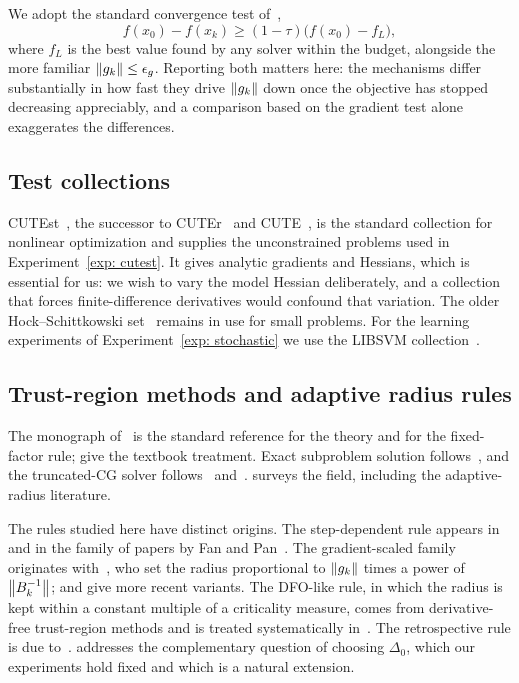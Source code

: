 \documentclass[11pt]{article}
\theoremstyle{plain}
\theoremstyle{definition}
\theoremstyle{remark}
\numberwithin{equation}{section}
\begin{document}
We adopt the standard convergence test of~\citet{MoreWild09},
\begin{equation}
  f(x_0) - f(x_k) \geq (1 - \tau)\bigl(f(x_0) - f_L\bigr),
  \label{eqn: convergence test}
\end{equation}
where $f_L$ is the best value found by any solver within the budget, alongside the more familiar
$\left \lVert g_k \right \rVert \leq \epsilon_g$. Reporting both matters here: the mechanisms differ substantially
in how fast they drive $\left \lVert g_k \right \rVert$ down once the objective has stopped decreasing appreciably,
and a comparison based on the gradient test alone exaggerates the differences.

\subsection{Test collections}

CUTEst~\citep{GouldOrbanToint15}, the successor to
CUTEr~\citep{GouldOrbanToint03} and CUTE~\citep{BongartzConnGouldToint95}, is the standard
collection for nonlinear optimization and supplies the unconstrained problems used in
Experiment~\ref{exp: cutest}. It gives analytic gradients and Hessians, which is essential for
us: we wish to vary the model Hessian deliberately, and a collection that forces
finite-difference derivatives would confound that variation. The older Hock--Schittkowski
set~\citep{HockSchittkowski81} remains in use for small problems. For the learning experiments
of Experiment~\ref{exp: stochastic} we use the LIBSVM
collection~\citep{ChangLin11}.

\subsection{Trust-region methods and adaptive radius rules}

The monograph of~\citet{ConnGoulToin00} is the standard reference for the theory and for the
fixed-factor rule; \citet{NoceWrig06} give the textbook treatment. Exact subproblem solution
follows~\citet{MoreSorensen1983}, and the truncated-CG solver
follows~\citet{Steihaug83} and~\citet{Toint81}. \citet{Yuan15} surveys the field, including the
adaptive-radius literature.

The rules studied here have distinct origins. The step-dependent rule appears
in~\citet{Hei03} and in the family of papers by Fan and Pan~\citep{FanPan06, FanPan10, FanPan11,
FanPan16}. The gradient-scaled family originates
with~\citet{ZhangZhangLiao02}, who set the radius proportional to $\left \lVert g_k \right \rVert$ times a power of
$\left \lVert B_k^{-1} \right \rVert$; \citet{WangYuan2022} and \citet{CurtSche20} give more recent variants. The
DFO-like rule, in which the radius is kept within a constant multiple of a criticality measure,
comes from derivative-free trust-region methods and is treated systematically
in~\citet{ConnScheVice09_introduction}. The retrospective rule is due
to~\citet{BastMalmMoufToinToma10}. \citet{Sartenaer97} addresses the complementary question of
choosing $\Delta_0$, which our experiments hold fixed and which is a natural extension.
\end{document}
